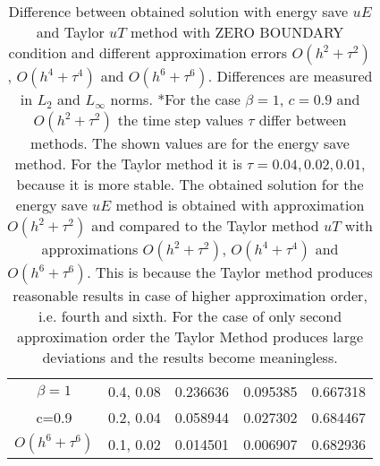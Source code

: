 \documentclass{article}
\begin{document}
\begin{table}[ht]
\begin{tabular}{||c|l|l|l|l||}
    \hline
  $\beta=1$                   & 0.4, 0.08        & 0.236636  & 0.095385  & 0.667318 \\
      c=0.9                       & 0.2, 0.04        & 0.058944   & 0.027302  &0.684467   \\
     $O(h^6+ \tau^6)$   & 0.1, 0.02    & 0.014501   & 0.006907    & 0.682936   \\
	   \hline
			\hline 
		\end{tabular}
		\caption{Difference between obtained solution with energy save $uE$ and Taylor $uT$ method with ZERO BOUNDARY condition and different approximation errors $O(h^{2} + \tau^2 )$, $O(h^{4} + \tau^4 )$ and $O(h^{6} + \tau^6 )$. Differences are measured in $L_2$ and $L_\infty$ norms. *For the case  $\beta=1$, $c=0.9$ and $O(h^2+ \tau^2)$ the time step values $\tau$ differ between methods. The shown values are for the energy save method. For the Taylor method it is $\tau = 0.04, 0.02, 0.01 $, because it is more stable. The obtained solution for the energy save $uE$ method is obtained with approximation $O(h^2+ \tau^2)$ and compared to the Taylor method $uT$ with approximations $O(h^{2} + \tau^2 )$, $O(h^{4} + \tau^4 )$ and $O(h^{6} + \tau^6 )$. This is because the Taylor method produces reasonable results in case of  higher approximation order, i.e. fourth and sixth. For the case of only second approximation order the Taylor Method produces large deviations and the results become meaningless.}
\label{tableE}
\end{table}
\end{document}
